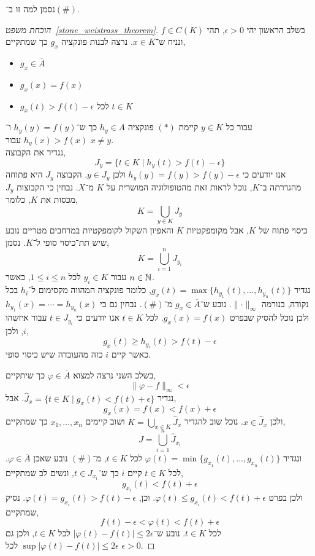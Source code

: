נסמן למה זו ב־$(\#)$.
\begin{proof}[הוכחת משפט\ \ref{stone_weistrass_theorem}]
	בשלב הראשון יהי $\epsilon > 0$, תהי $f \in C(K)$ ונניח ש־$x \in K$.
	נרצה לבנות פונקציה $g_x$ כך שמתקיים,
	\begin{itemize}
		\item $g_x \in \overline{A}$
		\item $g_x(x) = f(x)$
		\item $g_x(t) > f(t) - \epsilon$ לכל $t \in K$
	\end{itemize}
	עבור כל $y \in K$ קיימת $(*)$ פונקציה $h_y \in A$ כך ש־$h_y(y) = f(y)$ ו־$h_y(x) > f(x)$ עבור $x \ne y$. \\
	נגדיר את הקבוצה,
	\[
		J_y
		= \{ t \in K \mid h_y(t) > f(t) - \epsilon \}
	\]
	אנו יודעים כי $h_y(y) = f(y) > f(y) - \epsilon$ ולכן $y \in J_y$.
	הקבוצה $J_y$ היא פתוחה מהגדרתה ב־$K$, נוכל לראות זאת מהטופולוגיה המושרית על $K$ מ־$X$.
	נבחין כי הקבוצות $J_y$ מכסות את $K$, כלומר,
	\[
		K
		= \bigcup_{y \in K} J_y
	\]
	כיסוי פתוח של $K$, אבל מקומפקטיות $K$ והאפיון השקול לקומפקטיות במרחבים מטריים נובע שיש תת־כיסוי סופי ל־$K$.
	נסמן,
	\[
		K = \bigcup_{i = 1}^n J_{y_i}
	\]
	עבור $y_i \in K$ לכל $1 \le i \le n$, כאשר $n \in \mathbb{N}$. \\
	נגדיר $g_x(t) = \max\{ h_{y_1}(t), \ldots, h_{y_n}(t) \}$, כלומר פונקציה המהווה מקסימום ל־$h_i$ בכל נקודה, בנורמה $\lVert \cdot \rVert_\infty$.
	נובע ש־$g_x \in \overline{A}$ מ־$(\#)$.
	נבחין גם כי $h_{y_1}(x) = \cdots = h_{y_n}(x)$ ולכן נוכל להסיק שבפרט $g_x(x) = f(x)$.
	לכל $t \in K$ אנו יודעים כי $t \in J_{y_i}$ עבור איזשהו $i$, ולכן,
	\[
		g_x(t)
		\ge h_{y_i}(t)
		> f(t) - \epsilon
	\]
	כאשר קיים $i$ כזה מהעובדה שיש כיסוי סופי.

	בשלב השני נרצה למצוא $\varphi \in \overline{A}$ כך שיתקיים,
	\[
		\lVert \varphi - f \rVert_\infty < \epsilon
	\]
	נגדיר $\hat{J}_x = \{ t \in K \mid g_x(t) < f(t) + \epsilon \}$.
	אבל,
	\[
		g_x(x)
		= f(x)
		< f(x) + \epsilon
	\]
	ולכן $x \in \hat{J}_x$.
	נוכל שוב להגדיר $K = \bigcup_{x \in K} \hat{J}_x$ ושוב קיימים $x_1, \ldots, x_n$ כך שמתקיים,
	\[
		J
		= \bigcup_{i = 1}^n \hat{J}_{x_i}
	\]
	ונגדיר $\varphi(t) = \min\{ g_{x_1}(t), \ldots, g_{x_n}(t) \}$ לכל $t \in K$, מ־$(\#)$ נובע שאכן $\varphi \in \overline{A}$.
	לכל $t \in K$ קיים $i$ כך ש־$t \in \hat{J}_{x_i}$, ונשים לב שמתקיים,
	\[
		g_{x_i}(t)
		< f(t) + \epsilon
	\]
	ולכן בפרט $\varphi(t) \le g_{x_i}(t) < f(t) + \epsilon$.
	וכן, $\varphi(t) = g_{x_i}(t) > f(t) - \epsilon$.
	נסיק שמתקיים,
	\[
		f(t) - \epsilon
		< \varphi(t)
		< f(t) + \epsilon
	\]
	לכל $t \in K$.
	נובע ש־$|\varphi(t) - f(t)| \le 2 \epsilon$ לכל $t \in K$, ולכן גם $\sup |\varphi(t) - f(t)| \le 2 \epsilon$ לכל $\epsilon > 0$.
\end{proof}

